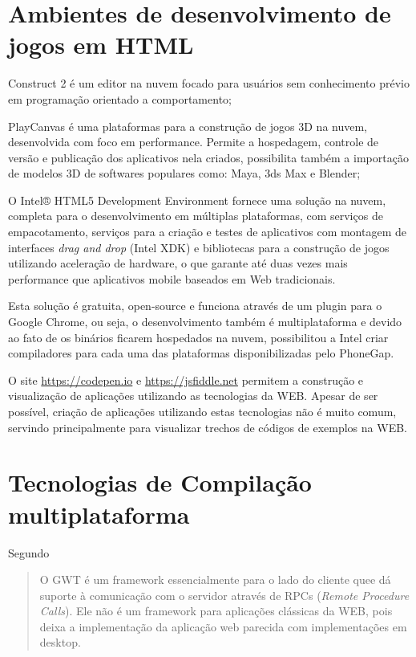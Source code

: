
\chapter{Ambientes de desenvolvimento de jogos em HTML}

Construct 2 é um editor na nuvem focado para usuários sem
conhecimento prévio em programação orientado a comportamento;

PlayCanvas é uma plataformas para a construção de jogos 3D
na nuvem, desenvolvida com foco em performance. Permite a hospedagem,
controle de versão e publicação dos aplicativos nela criados,
possibilita também a importação de modelos 3D de softwares populares
como: Maya, 3ds Max e Blender;

O Intel® HTML5 Development Environment fornece uma solução na nuvem,
completa para o desenvolvimento em múltiplas plataformas, com serviços de
empacotamento, serviços para a criação e testes de aplicativos com
montagem de interfaces \textit{drag and drop} (Intel XDK) e bibliotecas
para a construção de jogos utilizando aceleração de hardware, o que
garante até duas vezes mais performance que aplicativos mobile baseados
em Web tradicionais.

Esta solução é gratuita, open-source e funciona através de um
plugin para o Google Chrome, ou seja, o desenvolvimento também é
multiplataforma e devido ao fato de os binários ficarem hospedados
na nuvem, possibilitou a Intel criar compiladores para cada uma das
plataformas disponibilizadas pelo PhoneGap.

O site \url{https://codepen.io} e \url{https://jsfiddle.net} permitem a
construção e visualização de aplicações utilizando as tecnologias
da WEB. Apesar de ser possível, criação de aplicações utilizando
estas tecnologias não é muito comum, servindo principalmente para
visualizar trechos de códigos de exemplos na WEB.


\chapter{Tecnologias de Compilação multiplataforma}

Segundo \cite[pp. 29]{gtw}
\begin{quote}
O GWT é um framework essencialmente para o lado do cliente quee dá
suporte à comunicação com o servidor através de RPCs (\textit{Remote
Procedure Calls}). Ele não é um framework para aplicações clássicas
da WEB, pois deixa a implementação da aplicação web parecida com
implementações em desktop.
\end{quote}

